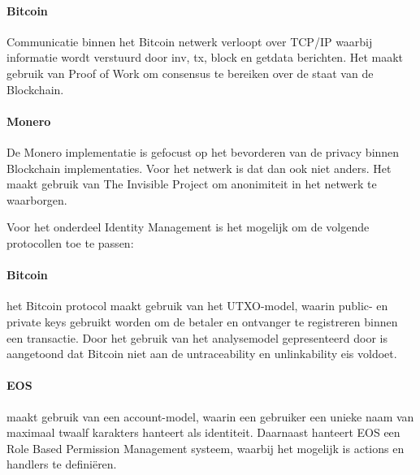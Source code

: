\paragraph{Bitcoin}

Communicatie binnen het Bitcoin netwerk verloopt over TCP/IP waarbij informatie wordt verstuurd door inv, tx, block en getdata berichten. Het maakt gebruik van Proof of Work om consensus te bereiken over de staat van de Blockchain.

\paragraph{Monero}

De Monero implementatie is gefocust op het bevorderen van de privacy binnen Blockchain implementaties. Voor het netwerk is dat dan ook niet anders. Het maakt gebruik van The Invisible Project om anonimiteit in het netwerk te waarborgen.

Voor het onderdeel Identity Management is het mogelijk om de volgende protocollen toe te passen:

\paragraph{Bitcoin} het Bitcoin protocol maakt gebruik van het UTXO-model, waarin public- en private keys gebruikt worden om de betaler en ontvanger te registreren binnen een transactie. Door het gebruik van het analysemodel gepresenteerd door \cite{reid2013analysis} is aangetoond dat Bitcoin niet aan de untraceability en unlinkability eis voldoet.

\paragraph{EOS} maakt gebruik van een account-model, waarin een gebruiker een unieke naam van maximaal twaalf karakters hanteert als identiteit. Daarnaast hanteert EOS een Role Based Permission Management systeem, waarbij het mogelijk is actions en handlers te definiëren.



